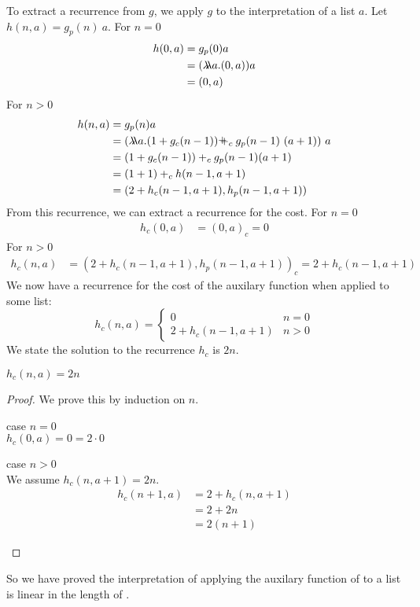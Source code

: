 %
%
To extract a recurrence from $g$, we apply $g$ to the interpretation of a list $a$.
%
Let $h(n,a) = g_p(n)\ a$.
%
For $n=0$
%
\begin{align*}
  h(0,a) &= g_p(0) a \\
         &= (\lambda\!\!\lambda a.(0,a)) a \\
         &= (0, a)
\end{align*}
%
For $n>0$
%
\begin{align*}
  h(n,a) &= g_p(n) a \\ 
         &= (\llambda a. (1 + g_c(n-1)) \pplus_c g_p(n-1)\ (a+1))\ a \\
         &= (1 + g_c(n-1)) +_c g_p(n-1) (a+1) \\
         &= (1 + 1) +_c h(n-1,a+1) \\
         &= (2 + h_c(n-1,a+1), h_p(n-1,a+1))
\end{align*}
%
From this recurrence, we can extract a recurrence for the cost.
%
For $n=0$
%
\begin{align*}
h_c(0,a) &= (0, a)_c = 0
\end{align*}
%
For $n>0$
%
\begin{align*}
  h_c(n,a) &= (2 + h_c(n-1,a+1), h_p(n-1,a+1))_c = 2 + h_c(n-1,a+1)
\end{align*}
%
We now have a recurrence for the cost of the auxilary function
 when applied to some list:
%
\begin{equation}
  h_c(n,a) = \begin{cases}
    0 & n = 0 \\
    2 + h_c(n-1,a+1) & n > 0
  \end{cases}
\end{equation}
%
We state the solution to the recurrence $h_c$ is $2n$.
%
\begin{theorem}
  \label{lem:fr_interp_h_cost}
  $h_c(n,a) = 2n$
\end{theorem}
%
\begin{proof}
  We prove this by induction on $n$.
  \begin{description}
    \item{case $n=0$}\hfill \\
      $h_c(0,a) = 0 = 2 \cdot 0$ 
    \item{case $n>0$}\hfill \\
      We assume $h_c(n,a+1) = 2n$.
      \begin{align*}
        h_c(n+1,a) &= 2 + h_c(n,a+1) \\
                   &= 2 + 2n  \\
                   &= 2(n+1)
      \end{align*}
  \end{description}
\end{proof}  
%
So we have proved the interpretation of applying the auxilary function of
 to a list is linear in the length of .



